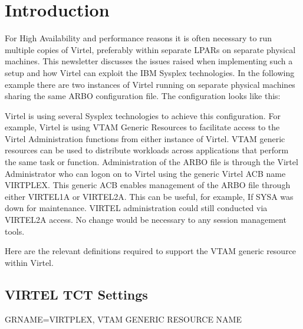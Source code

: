 \documentclass[letterpaper,10pt,english]{sphinxmanual}
\begin{document}
\section{Introduction}
\label{\detokenize{connectivity_guide:id75}}
\sphinxAtStartPar
For High Availability and performance reasons it is often necessary to run multiple copies of Virtel, preferably within separate LPARs on separate physical machines. This newsletter discusses the issues raised when implementing such a setup and how Virtel can exploit the IBM Sysplex technologies. In the following example there are two instances of Virtel running on separate physical machines sharing the same ARBO configuration file. The configuration looks like this:\sphinxhyphen{}

\sphinxAtStartPar
{}

\sphinxAtStartPar
Virtel is using several Sysplex technologies to achieve this configuration. For example, Virtel is using VTAM Generic Resources to facilitate access to the Virtel Administration functions from either instance of Virtel. VTAM generic resources can be used to distribute workloads across applications that perform the same task or function. Administration of the ARBO file is through the Virtel Administrator who can logon on to Virtel using the generic Virtel ACB name VIRTPLEX. This generic ACB enables management of the ARBO file through either VIRTEL1A or VIRTEL2A. This can be useful, for example, If SYSA was down for maintenance. VIRTEL administration could still conducted via VIRTEL2A access. No change would be necessary to any session management tools.

\sphinxAtStartPar
Here are the relevant definitions required to support the VTAM generic resource within Virtel.

\ignorespaces 

\subsection{VIRTEL TCT Settings}
\label{\detokenize{connectivity_guide:virtel-tct-settings}}\label{\detokenize{connectivity_guide:index-170}}
\sphinxAtStartPar
GRNAME=VIRTPLEX, VTAM GENERIC RESOURCE NAME

\ignorespaces 
\end{document}
